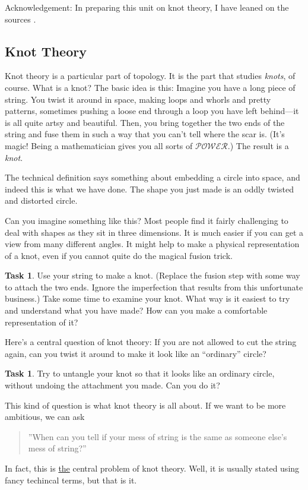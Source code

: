 \documentclass[12pt,letterpaper]{article}
\theoremstyle{definition}
\newtheorem{task}[question]{Task}
\begin{document}
Acknowledgement: In preparing this unit on knot theory, I have leaned on the sources \cite{Adams, ArtOfMath:knots, knotinfo}.

\subsection*{Knot Theory}

Knot theory is a particular part of topology. 
It is the part that studies \emph{knots}, of course.
What is a knot?
The basic idea is this:
Imagine you have a long piece of string.
You twist it around in space, making loops and whorls and pretty patterns, sometimes pushing a loose end through a loop you have left behind---it is all quite artsy and beautiful.
Then, you bring together the two ends of the string and fuse them in such a way that you can't tell where the scar is.
(It's magic!
Being a mathematician gives you all sorts of 
$\mathcal{POWER}$.)
The result is a \emph{knot}.

The technical definition says something about embedding a circle into space, and indeed this is what we have done.
The shape you just made is an oddly twisted and distorted circle.

Can you imagine something like this?
Most people find it fairly challenging to deal with shapes as they sit in three dimensions.
It is much easier if you can get a view from many different angles.
It might help to make a physical representation of a knot, even if you cannot quite do the magical fusion trick.

\begin{task}
Use your string to make a knot.
(Replace the fusion step with some way to attach the two ends. 
Ignore the imperfection that results from this unfortunate business.)
Take some time to examine your knot.
What way is it easiest to try and understand what you have made?
How can you make a comfortable representation of it?
\end{task}

Here's a central question of knot theory: If you are not allowed to cut the string again, can you twist it around to make it look like an ``ordinary'' circle?

\begin{task}
Try to untangle your knot so that it looks like an ordinary circle, without undoing the attachment you made. Can you do it?
\end{task}

This kind of question is what knot theory is all about.
If we want to be more ambitious, we can ask
\begin{quote}
''When can you tell if your mess of string is the same as someone else's mess of string?''
\end{quote}
In fact, this is \underline{the} central problem of knot theory.
Well, it is usually stated using fancy techincal terms, but that is it.
\end{document}
